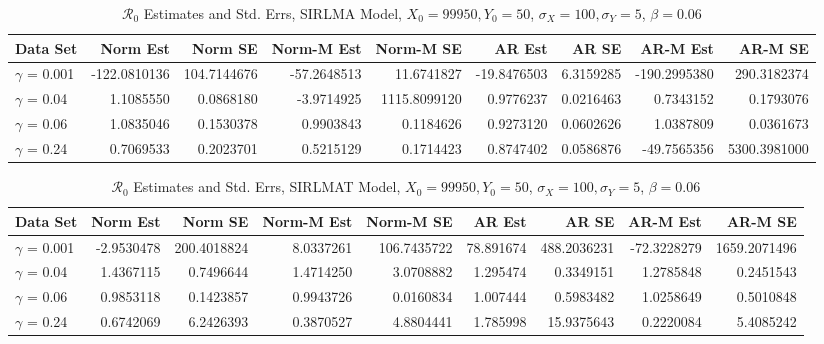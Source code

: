 \documentclass[12pt]{article}
\newcommand{\rr}{\ensuremath{\mathcal{R}_0}}
\begin{document}
\begin{table}[H]
	
	\caption{\label{tab:}$\rr$ Estimates and Std. Errs, SIRLMA Model,
		$X_0 = 99950, Y_0 = 50$, $\sigma_X = 100, \sigma_Y = 5$, $\beta = 0.06$}
	\centering
	\begin{footnotesize}
	\begin{tabular}[t]{l|r|r|r|r|r|r|r|r}
		\hline
		Data Set & Norm Est & Norm SE & Norm-M Est & Norm-M SE & AR Est & AR SE & AR-M Est & AR-M SE\\
		\hline
		$\gamma$ = 0.001 & -122.0810136 & 104.7144676 & -57.2648513 & 11.6741827 & -19.8476503 & 6.3159285 & -190.2995380 & 290.3182374\\
		\hline
		$\gamma$ = 0.04 & 1.1085550 & 0.0868180 & -3.9714925 & 1115.8099120 & 0.9776237 & 0.0216463 & 0.7343152 & 0.1793076\\
		\hline
		$\gamma$ = 0.06 & 1.0835046 & 0.1530378 & 0.9903843 & 0.1184626 & 0.9273120 & 0.0602626 & 1.0387809 & 0.0361673\\
		\hline
		$\gamma$ = 0.24 & 0.7069533 & 0.2023701 & 0.5215129 & 0.1714423 & 0.8747402 & 0.0586876 & -49.7565356 & 5300.3981000\\
		\hline
	\end{tabular}
\end{footnotesize}
\end{table}
\begin{table}[H]
	
	\caption{\label{tab:}$\rr$ Estimates and Std. Errs, SIRLMAT Model,
		$X_0 = 99950, Y_0 = 50$, $\sigma_X = 100, \sigma_Y = 5$, $\beta = 0.06$}
	\centering
	\begin{footnotesize}
	\begin{tabular}[t]{l|r|r|r|r|r|r|r|r}
		\hline
		Data Set & Norm Est & Norm SE & Norm-M Est & Norm-M SE & AR Est & AR SE & AR-M Est & AR-M SE\\
		\hline
		$\gamma$ = 0.001 & -2.9530478 & 200.4018824 & 8.0337261 & 106.7435722 & 78.891674 & 488.2036231 & -72.3228279 & 1659.2071496\\
		\hline
		$\gamma$ = 0.04 & 1.4367115 & 0.7496644 & 1.4714250 & 3.0708882 & 1.295474 & 0.3349151 & 1.2785848 & 0.2451543\\
		\hline
		$\gamma$ = 0.06 & 0.9853118 & 0.1423857 & 0.9943726 & 0.0160834 & 1.007444 & 0.5983482 & 1.0258649 & 0.5010848\\
		\hline
		$\gamma$ = 0.24 & 0.6742069 & 6.2426393 & 0.3870527 & 4.8804441 & 1.785998 & 15.9375643 & 0.2220084 & 5.4085242\\
		\hline
	\end{tabular}
\end{footnotesize}
\end{table}
\end{document}
